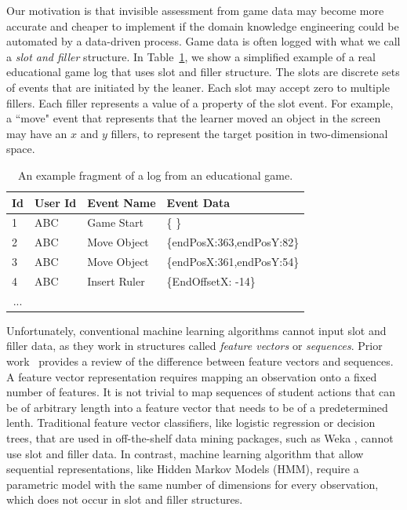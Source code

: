 \documentclass{sigchi}
\begin{document}
Our motivation is that invisible assessment from game data may become more accurate and cheaper to implement if the domain knowledge engineering could be automated by a data-driven process.
Game data is often logged  with what we call a \textit{slot and filler} structure.
In Table~\ref{tbl:log_example}, we show a simplified example of a real educational game log that uses slot and filler structure.
The slots are discrete sets of events that are initiated by the leaner.
Each slot may accept zero to multiple fillers. 
Each filler represents a value of a property of the slot event.
For example, a ``move" event  that represents that the learner moved an object in the screen may have an $x$ and $y$ fillers, to represent the target position in two-dimensional space.


\begin{table}[tbh]
\caption{An example fragment of a log from an educational game. \label{tbl:log_example}}
\begin{tabular}{@{}llll@{}}
\toprule
\textbf{Id}             & \textbf{User Id} & \textbf{Event Name} & \textbf{Event Data}        \\ \midrule
1                       & ABC              & Game Start          & \{ \}                        \\
2                       & ABC              & Move Object         & \{endPosX:363,endPosY:82\} \\
3                       & ABC              & Move Object         & \{endPosX:361,endPosY:54\} \\
4                       & ABC              & Insert Ruler        & \{EndOffsetX: -14\}        \\
\multicolumn{1}{c}{...} &                  &                     &                            \\ \bottomrule
\end{tabular}
\end{table}


Unfortunately, conventional machine learning algorithms cannot input slot and filler data, as they  work in  structures called \textit{feature vectors} or \textit{sequences}.
Prior work~\cite{sequences} provides a   review of  the difference between feature vectors and sequences.
A feature vector representation requires mapping an observation onto a fixed number of features.
It is not trivial to map sequences of student actions that can be of arbitrary length into a feature vector that needs to be of a predetermined lenth.
Traditional feature vector classifiers,  like logistic regression or decision trees,  that are used in off-the-shelf data mining packages, such as Weka \cite{hall2009weka}, cannot  use slot and filler data. 
In contrast, machine learning algorithm that allow sequential representations, like Hidden Markov Models (HMM), require a parametric model with the same number of dimensions for every observation, which does not occur in slot and filler structures.
\end{document}

